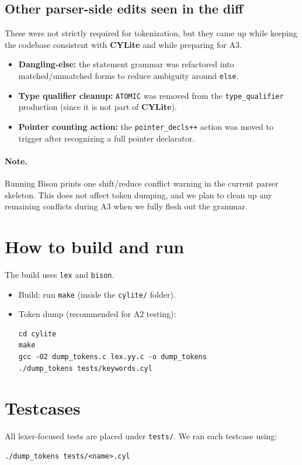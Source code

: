 \documentclass[11pt]{article}
\newcommand{\lang}{\textbf{CYLite}}
\begin{document}
\subsection*{Other parser-side edits seen in the diff}
These were not strictly required for tokenization, but they came up while keeping the codebase consistent with \lang{} and while preparing for A3.
\begin{itemize}
	\item \textbf{Dangling-else:} the statement grammar was refactored into matched/unmatched forms to reduce ambiguity around \texttt{else}.
	\item \textbf{Type qualifier cleanup:} \texttt{ATOMIC} was removed from the \texttt{type\_qualifier} production (since it is not part of \lang{}).
	\item \textbf{Pointer counting action:} the \texttt{pointer\_decls++} action was moved to trigger after recognizing a full pointer declarator.
\end{itemize}

\paragraph{Note.}
Running Bison prints one shift/reduce conflict warning in the current parser skeleton.
This does not affect token dumping, and we plan to clean up any remaining conflicts during A3 when we fully flesh out the grammar.

\section{How to build and run}
The build uses \texttt{lex} and \texttt{bison}.
\begin{itemize}
	\item Build: run \texttt{make} (inside the \texttt{cylite/} folder).
	\item Token dump (recommended for A2 testing):
	\begin{lstlisting}
cd cylite
make
gcc -O2 dump_tokens.c lex.yy.c -o dump_tokens
./dump_tokens tests/keywords.cyl
	\end{lstlisting}
\end{itemize}

\section{Testcases}
All lexer-focused tests are placed under \texttt{tests/}. We ran each testcase using:
\begin{lstlisting}
./dump_tokens tests/<name>.cyl
\end{lstlisting}
\end{document}
